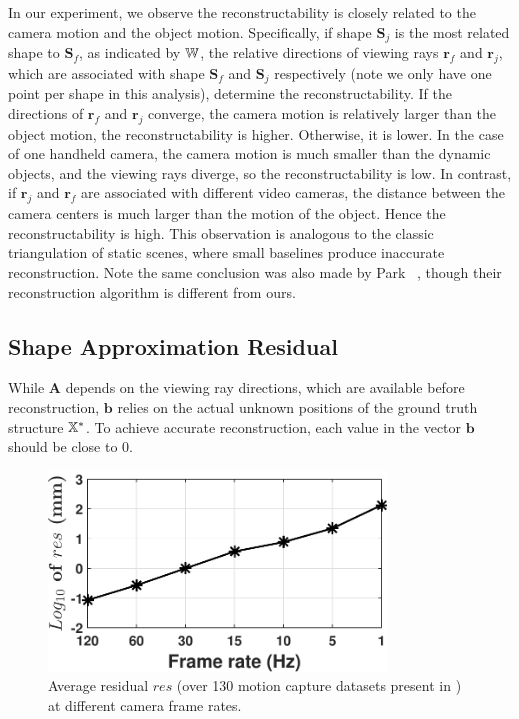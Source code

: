 In our experiment, we observe the reconstructability is closely related to the camera motion and the object motion. 
Specifically, if shape $\mathbf{S}_j$ is the most related shape to $\mathbf{S}_f$, as indicated by $\mathbb W$, the relative directions of viewing rays $\mathbf{r}_f$ and $\mathbf{r}_j$, which are associated with shape $\mathbf{S}_f$ and $\mathbf{S}_j$ respectively (note we only have one point per shape in this analysis), determine the reconstructability. If the directions of $\mathbf{r}_f$ and $\mathbf{r}_j$ converge, \ie the camera motion is relatively larger than the object motion, the reconstructability is higher. Otherwise, it is lower. 
In the case of one handheld camera, the camera motion is much smaller than the dynamic objects,  and the viewing rays diverge, so the reconstructability is low. In contrast, if $\mathbf{r}_j$ and $\mathbf{r}_f$ are associated with different video cameras, the distance between the camera centers is much larger than the motion of the object. Hence the reconstructability is high.
This observation is analogous to the classic triangulation of static scenes, where small baselines produce inaccurate reconstruction. Note the same conclusion was also made by Park \etal~\cite{park20153d}, though their reconstruction algorithm is different from ours.



\subsection{Shape Approximation Residual} \label{sec:shape_approximation}
While $\mathbf{A}$ depends on the viewing ray directions, which are available before reconstruction, $\mathbf{b}$ relies on the actual unknown positions of the ground truth structure $\mathbb X^*$. To achieve accurate reconstruction, each value in the vector $\mathbf{b}$ should be close to 0. 

\begin{figure}
\centering
\includegraphics[width=0.80\textwidth]{chapter5/resource/residual.pdf}
\caption[Average residual at differernt camera frame rates.]{Average residual $res$ (over 130 motion capture datasets present in \cite{cg-2007-2}) at different camera frame rates.}
\label{fig:residual}
\end{figure}

